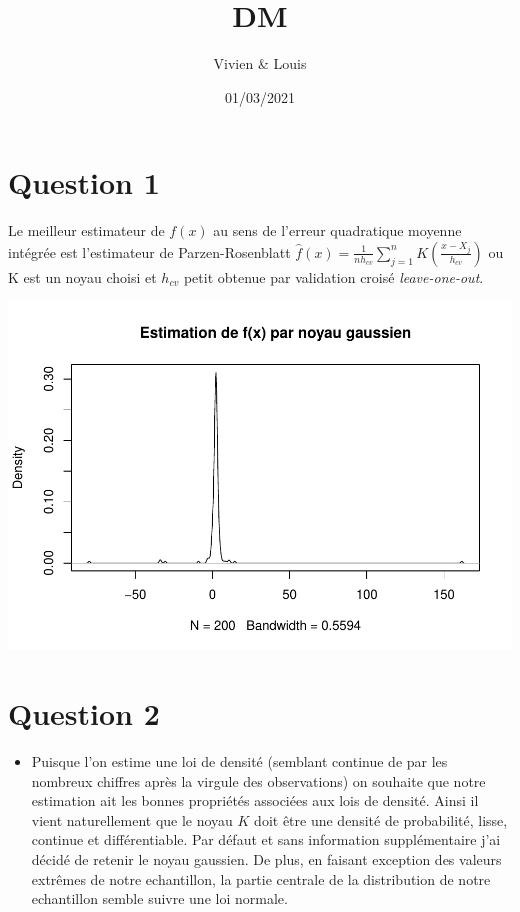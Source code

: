 \documentclass[
]{article}
\title{DM}
\author{Vivien \& Louis}
\date{01/03/2021}
\providecommand{\tightlist}{%
  \setlength{\itemsep}{0pt}\setlength{\parskip}{0pt}}
\begin{document}
\maketitle

\hypertarget{question-1}{%
\section{Question 1}\label{question-1}}

Le meilleur estimateur de \({f}(x)\) au sens de l'erreur quadratique
moyenne intégrée est l'estimateur de Parzen-Rosenblatt
\(\hat{f}(x) = \frac{1}{nh_{cv}}\sum_{j=1}^{n}K(\frac{x-X_{j}}{h_{cv}})\)
ou K est un noyau choisi et \(h_{cv}\) petit obtenue par validation
croisé \emph{leave-one-out}.

\includegraphics{DM_files/figure-latex/unnamed-chunk-2-1.pdf}

\hypertarget{question-2}{%
\section{Question 2}\label{question-2}}

\begin{itemize}
\tightlist
\item
  Puisque l'on estime une loi de densité (semblant continue de par les
  nombreux chiffres après la virgule des observations) on souhaite que
  notre estimation ait les bonnes propriétés associées aux lois de
  densité. Ainsi il vient naturellement que le noyau \(K\) doit être une
  densité de probabilité, lisse, continue et différentiable. Par défaut
  et sans information supplémentaire j'ai décidé de retenir le noyau
  gaussien. De plus, en faisant exception des valeurs extrêmes de notre
  echantillon, la partie centrale de la distribution de notre
  echantillon semble suivre une loi normale.
\end{itemize}
\end{document}
